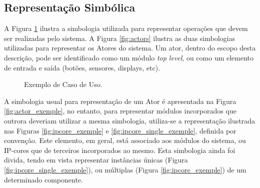 \documentclass{article}
\begin{document}
  \subsection{Representação Simbólica}
  A Figura \ref{fig:uc_exemple} ilustra a simbologia utilizada para representar operações que devem ser realizadas pelo sistema. A Figura \ref{fig:actors} ilustra as duas simbologias utilizadas para representar os Atores do sistema. Um ator, dentro do escopo desta descrição, pode ser identificado como um módulo \textit{top level}, ou como um elemento de entrada e saída (botões, sensores, displays, etc).
  
    \begin{figure}[H]
      \centering
      \caption{Exemplo de Caso de Uso.}
      \label{fig:uc_exemple}
    \end{figure}
  
  A simbologia usual para representação de um Ator é apresentada na Figura \ref{fig:actor_exemple}, no entanto, para representar módulos incorporados que outrora deveriam utilizar a mesma simbologia, utiliza-se a representação ilustrada nas Figuras \ref{fig:ipcore_exemple} e \ref{fig:ipcore_single_exemple}, definida por convenção. Este elemento, em geral, está associado aos módulos do sistema, ou IP-cores que de terceiros incorporados ao mesmo. Esta simbologia ainda foi divida, tendo em vista representar instâncias únicas (Figura \ref{fig:ipcore_single_exemple}), ou múltiplas (Figura \ref{fig:ipcore_exemple}) de um determinado componente. 
  
\end{document}
